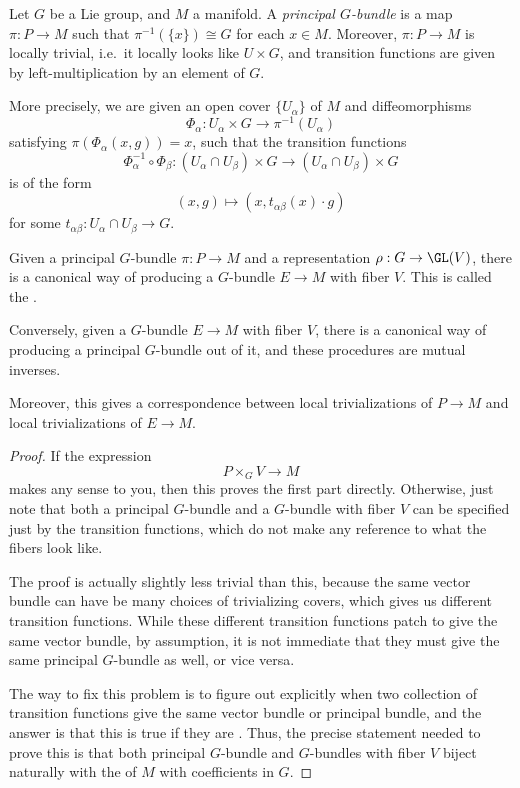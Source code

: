 \documentclass[a4paper]{article}
\begin{document}
\begin{defi}
  Let $G$ be a Lie group, and $M$ a manifold. A \emph{principal $G$-bundle} is a map $\pi: P \to M$ such that $\pi^{-1}(\{x\}) \cong G$ for each $x \in M$. Moreover, $\pi: P \to M$ is locally trivial, i.e.\ it locally looks like $U \times G$, and transition functions are given by left-multiplication by an element of $G$.

  More precisely, we are given an open cover $\{U_\alpha\}$ of $M$ and diffeomorphisms
  \[
    \Phi_\alpha: U_\alpha \times G \to \pi^{-1}(U_\alpha)
  \]
  satisfying $\pi(\Phi_\alpha(x, g)) = x$, such that the transition functions
  \[
    \Phi_\alpha^{-1} \circ \Phi_\beta: (U_\alpha \cap U_\beta) \times G \to (U_\alpha \cap U_\beta) \times G
  \]
  is of the form
  \[
    (x, g) \mapsto (x, t_{\alpha\beta}(x) \cdot g)
  \]
  for some $t_{\alpha\beta}: U_\alpha \cap U_\beta \to G$.
\end{defi}

\begin{thm}
  Given a principal $G$-bundle $\pi: P \to M$ and a representation $\rho: G \to \GL(V)$, there is a canonical way of producing a $G$-bundle $E \to M$ with fiber $V$. This is called the .

  Conversely, given a $G$-bundle $E\to M$ with fiber $V$, there is a canonical way of producing a principal $G$-bundle out of it, and these procedures are mutual inverses.

  Moreover, this gives a correspondence between local trivializations of $P \to M$ and local trivializations of $E \to M$.
\end{thm}

\begin{proof}
  If the expression
  \[
    P \times_G V \to M
  \]
  makes any sense to you, then this proves the first part directly. Otherwise, just note that both a principal $G$-bundle and a $G$-bundle with fiber $V$ can be specified just by the transition functions, which do not make any reference to what the fibers look like.

  The proof is actually slightly less trivial than this, because the same vector bundle can have be many choices of trivializing covers, which gives us different transition functions. While these different transition functions patch to give the same vector bundle, by assumption, it is not immediate that they must give the same principal $G$-bundle as well, or vice versa.

  The way to fix this problem is to figure out explicitly when two collection of transition functions give the same vector bundle or principal bundle, and the answer is that this is true if they are . Thus, the precise statement needed to prove this is that both principal $G$-bundle and $G$-bundles with fiber $V$ biject naturally with the  of $M$ with coefficients in $G$.
\end{proof}
\end{document}
